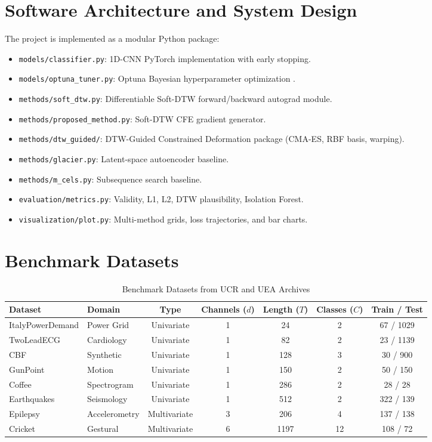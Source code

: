 \documentclass[11pt,a4paper]{report}
\begin{document}
\section{Software Architecture and System Design}
The project is implemented as a modular Python package:
\begin{itemize}
    \item \texttt{models/classifier.py}: 1D-CNN PyTorch implementation with early stopping.
    \item \texttt{models/optuna\_tuner.py}: Optuna Bayesian hyperparameter optimization \cite{akiba2019optuna}.
    \item \texttt{methods/soft\_dtw.py}: Differentiable Soft-DTW forward/backward autograd module.
    \item \texttt{methods/proposed\_method.py}: Soft-DTW CFE gradient generator.
    \item \texttt{methods/dtw\_guided/}: DTW-Guided Constrained Deformation package (CMA-ES, RBF basis, warping).
    \item \texttt{methods/glacier.py}: Latent-space autoencoder baseline.
    \item \texttt{methods/m\_cels.py}: Subsequence search baseline.
    \item \texttt{evaluation/metrics.py}: Validity, L1, L2, DTW plausibility, Isolation Forest.
    \item \texttt{visualization/plot.py}: Multi-method grids, loss trajectories, and bar charts.
\end{itemize}

\section{Benchmark Datasets}
\begin{table}[h!]
    \centering
    \caption{Benchmark Datasets from UCR and UEA Archives}
    \label{tab:datasets}
    \begin{tabular}{llccccc}
        \toprule
        \textbf{Dataset} & \textbf{Domain} & \textbf{Type} & \textbf{Channels ($d$)} & \textbf{Length ($T$)} & \textbf{Classes ($C$)} & \textbf{Train / Test} \\
        \midrule
        ItalyPowerDemand & Power Grid & Univariate & 1 & 24 & 2 & 67 / 1029 \\
        TwoLeadECG & Cardiology & Univariate & 1 & 82 & 2 & 23 / 1139 \\
        CBF & Synthetic & Univariate & 1 & 128 & 3 & 30 / 900 \\
        GunPoint & Motion & Univariate & 1 & 150 & 2 & 50 / 150 \\
        Coffee & Spectrogram & Univariate & 1 & 286 & 2 & 28 / 28 \\
        Earthquakes & Seismology & Univariate & 1 & 512 & 2 & 322 / 139 \\
        Epilepsy & Accelerometry & Multivariate & 3 & 206 & 4 & 137 / 138 \\
        Cricket & Gestural & Multivariate & 6 & 1197 & 12 & 108 / 72 \\
        \bottomrule
    \end{tabular}
\end{table}
\end{document}
